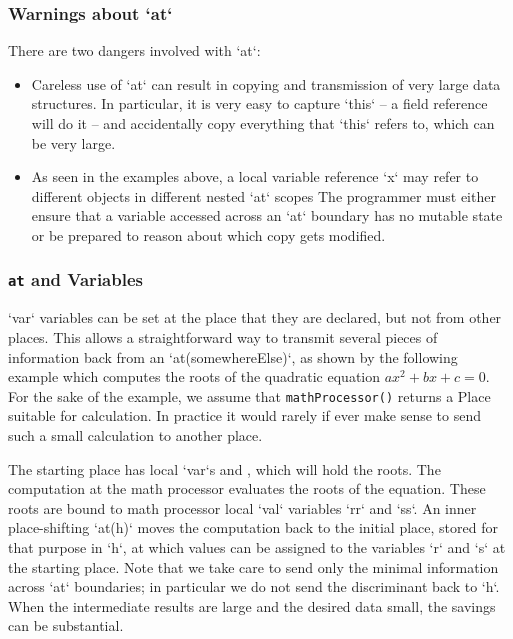 \subsubsection{Warnings about \xcd`at`}
There are two dangers involved with \xcd`at`: 
\begin{itemize}
\item Careless use of \xcd`at` can result in copying and transmission
of very large data structures.  In particular, it is very easy to capture
\xcd`this` -- a field reference will do it -- and accidentally copy everything
that \xcd`this` refers to, which can be very large.

\item As seen in the examples above, a local variable reference
  \xcd`x` may refer to different objects in different nested \xcd`at`
  scopes The programmer must either ensure that a variable accessed
  across an \xcd`at` boundary has no mutable state or be prepared to
  reason about which copy gets modified. 
\end{itemize}

\subsubsection{{\tt at} and Variables}

\xcd`var` variables can be set at the place that they are declared, but not
from other places.  This allows a straightforward way to transmit several
pieces of information back from an \xcd`at(somewhereElse)`, as shown by the
following example which computes the roots of the quadratic equation 
{$ax^2 + bx + c = 0$}.  
For the sake of the example, we assume that 
{\tt mathProcessor()} returns a Place suitable for calculation.  In practice
it would rarely if ever make sense to send such a small calculation to another
place. 

The starting place has local \xcd`var`s  and , which will hold
the roots.  
The computation at the math processor evaluates the roots of the equation.
These roots are bound to math processor local \xcd`val` variables \xcd`rr` and
\xcd`ss`.  An inner place-shifting \xcd`at(h)` moves the computation back to
the initial place, stored for that purpose in \xcd`h`, at which values can be
assigned to the variables \xcd`r` 
and \xcd`s` at the starting place.  Note that we take care to send only the
minimal information across \xcd`at` boundaries; in particular we do not 
send the discriminant back to \xcd`h`.  When the intermediate results are
large and the desired data small, the savings can be substantial.

